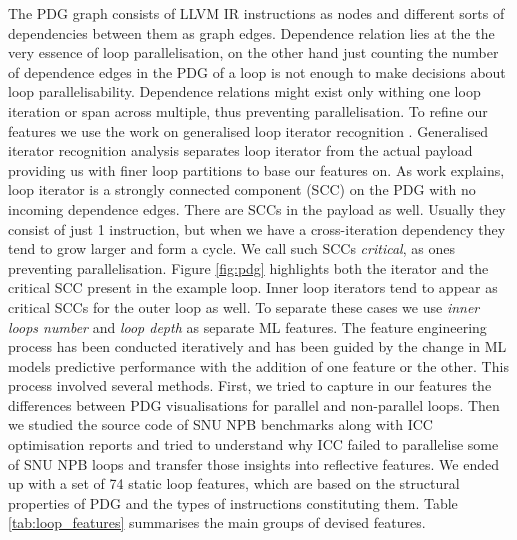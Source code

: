 \documentclass{acaces}
\begin{document}
\quad The PDG graph consists of LLVM IR instructions as nodes and different sorts of dependencies between them as graph edges. Dependence relation lies at the the very essence of loop parallelisation, on the other hand just counting the number of dependence edges in the PDG of a loop is not enough to make decisions about loop parallelisability. Dependence relations might exist only withing one loop iteration or span across multiple, thus preventing parallelisation.\newline\null
\quad To refine our features we use the work on generalised loop iterator recognition \cite{Manilov:2018:GPI:3178372.3179511}. Generalised iterator recognition analysis separates loop iterator from the actual payload providing us with finer loop partitions to base our features on. As work \cite{Manilov:2018:GPI:3178372.3179511} explains, loop iterator is a strongly connected component (SCC) on the PDG with no incoming dependence edges. There are SCCs in the payload as well. Usually they consist of just 1 instruction, but when we have a cross-iteration dependency they tend to grow larger and form a cycle. We call such SCCs \textit{critical}, as ones preventing parallelisation. Figure \ref{fig:pdg} highlights both the iterator and the critical SCC present in the example loop. Inner loop iterators tend to appear as critical SCCs for the outer loop as well. To separate these cases we use \textit{inner loops number} and \textit{loop depth} as separate ML features.\newline\null  
\quad The feature engineering process has been conducted iteratively and has been guided by the change in ML models predictive performance with the addition of one feature or the other. This process involved several methods. First, we tried to capture in our features the differences between PDG visualisations for parallel and non-parallel loops. Then we studied the source code of SNU NPB benchmarks along with ICC optimisation reports and tried to understand why ICC failed to parallelise some of SNU NPB loops and transfer those insights into reflective features.\newline\null
\quad We ended up with a set of 74 static loop features, which are based on the structural properties of PDG and the types of instructions constituting them. Table \ref{tab:loop_features} summarises the main groups of devised features.\newline\null
\end{document}
